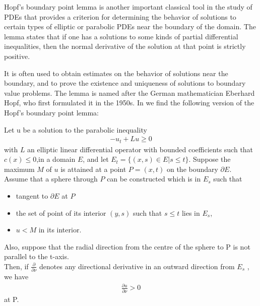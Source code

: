 Hopf's boundary point lemma is another important classical tool in the study of PDEs that provides a criterion for determining the behavior of solutions to certain types of elliptic or parabolic PDEs near the boundary of the domain. The lemma states that if one has a solutions to some kinds of partial differential inequalities, then the normal derivative of the solution at that point is strictly positive.

It is often used to obtain estimates on the behavior of solutions near the boundary, and to prove the existence and uniqueness of solutions to boundary value problems. The lemma is named after the German mathematician Eberhard Hopf, who first formulated it in the 1950s. In \cite{protterweinberger} we find the following version of the Hopf's boundary point lemma:

\begin{theorem}
	Let u be a solution to the parabolic inequality 
	\begin{align*}
		-u_t+Lu\geq 0
	\end{align*} 
	with $L$ an elliptic linear differential operator with bounded coefficients such that $c(x)\leq 0$,in a domain $E$, and let $E_t = \{(x, s) \in E | s \leq t\}$. Suppose the maximum $M$ of $u$ is attained at a point $P=(x, t)$ on the boundary $\partial E$. \\
	Assume that a sphere through $P$ can be constructed which is in $E_s$ such that
	\begin{itemize}\itemsep0em 
		\item tangent to $\partial E$ at $P$
		\item the set of point of its interior $(y, s)$ such that $s\leq t$ lies in $E_s$, 
		\item  $u < M$ in its interior.
	\end{itemize}	
	Also, suppose that the radial direction from the centre of the sphere to P is not parallel to the t-axis. \\
	Then, if $\frac{\partial}{\partial \nu}$ denotes any directional derivative in an outward direction from $E_s$ , we have
	\begin{align*}
		\frac{\partial u}{\partial \nu} > 0
	\end{align*}
	at P.\label{HopfBPL}
\end{theorem}

